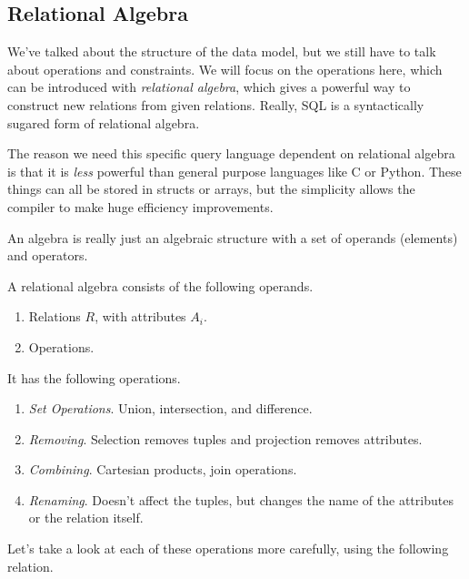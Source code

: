 \documentclass{article}
\begin{document}
  \subsection{Relational Algebra}

    We've talked about the structure of the data model, but we still have to talk about operations and constraints. We will focus on the operations here, which can be introduced with \textit{relational algebra}, which gives a powerful way to construct new relations from given relations. Really, SQL is a syntactically sugared form of relational algebra. 

    The reason we need this specific query language dependent on relational algebra is that it is \textit{less} powerful than general purpose languages like C or Python. These things can all be stored in structs or arrays, but the simplicity allows the compiler to make huge efficiency improvements. 

    An algebra is really just an algebraic structure with a set of operands (elements) and operators.  

    \begin{definition}
      A relational algebra consists of the following operands. 
      \begin{enumerate}
        \item Relations $R$, with attributes $A_i$. 
        \item Operations. 
      \end{enumerate}
      It has the following operations. 
      \begin{enumerate}
        \item \textit{Set Operations}. Union, intersection, and difference. 
        \item \textit{Removing}. Selection removes tuples and projection removes attributes. 
        \item \textit{Combining}. Cartesian products, join operations. 
        \item \textit{Renaming}. Doesn't affect the tuples, but changes the name of the attributes or the relation itself. 
      \end{enumerate}
    \end{definition}

    Let's take a look at each of these operations more carefully, using the following relation. 
\end{document}
